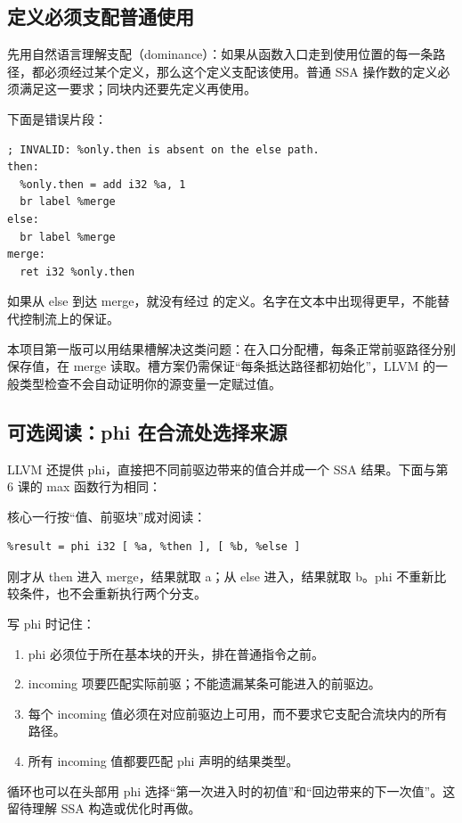 \subsection{定义必须支配普通使用}
先用自然语言理解支配（dominance）：如果从函数入口走到使用位置的每一条路径，都必须经过某个定义，那么这个定义支配该使用。普通 SSA 操作数的定义必须满足这一要求；同块内还要先定义再使用。

下面是错误片段：
\begin{lstlisting}
; INVALID: %only.then is absent on the else path.
then:
  %only.then = add i32 %a, 1
  br label %merge
else:
  br label %merge
merge:
  ret i32 %only.then
\end{lstlisting}
如果从 else 到达 merge，就没有经过  的定义。名字在文本中出现得更早，不能替代控制流上的保证。

本项目第一版可以用结果槽解决这类问题：在入口分配槽，每条正常前驱路径分别保存值，在 merge 读取。槽方案仍需保证“每条抵达路径都初始化”，LLVM 的一般类型检查不会自动证明你的源变量一定赋过值。

\clearpage
\subsection{可选阅读：phi 在合流处选择来源}
LLVM 还提供 phi，直接把不同前驱边带来的值合并成一个 SSA 结果。下面与第 6 课的 max 函数行为相同：


核心一行按“值、前驱块”成对阅读：
\begin{lstlisting}
%result = phi i32 [ %a, %then ], [ %b, %else ]
\end{lstlisting}
刚才从 then 进入 merge，结果就取 a；从 else 进入，结果就取 b。phi 不重新比较条件，也不会重新执行两个分支。

写 phi 时记住：
\begin{enumerate}
 \item phi 必须位于所在基本块的开头，排在普通指令之前。
 \item incoming 项要匹配实际前驱；不能遗漏某条可能进入的前驱边。
 \item 每个 incoming 值必须在对应前驱边上可用，而不要求它支配合流块内的所有路径。
 \item 所有 incoming 值都要匹配 phi 声明的结果类型。
\end{enumerate}
循环也可以在头部用 phi 选择“第一次进入时的初值”和“回边带来的下一次值”。这留待理解 SSA 构造或优化时再做。

